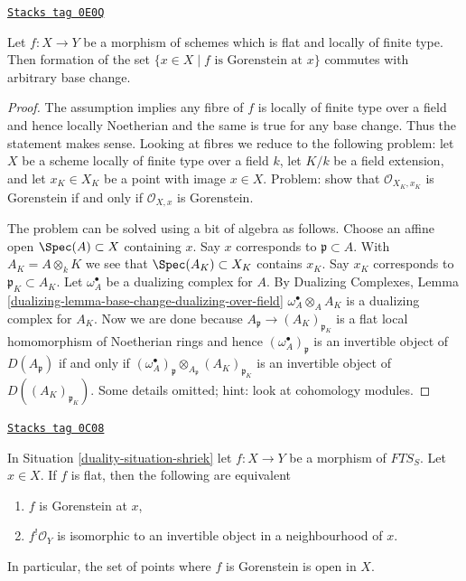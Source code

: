 \begin{lemma}
\label{duality-lemma-flat-lft-base-change-gorenstein}
\href{https://stacks.math.columbia.edu/tag/0E0Q}{\texttt{Stacks tag 0E0Q}}

Let $f : X \to Y$ be a morphism of schemes which is flat and
locally of finite type. Then formation of the set
$\{x \in X \mid f\text{ is Gorenstein at }x\}$
commutes with arbitrary base change.
\end{lemma}

\begin{proof}
The assumption implies any fibre of $f$ is locally of finite type
over a field and hence locally Noetherian and the same is true for
any base change. Thus the statement makes sense. Looking at
fibres we reduce to the following problem: let $X$ be a scheme
locally of finite type over a field $k$,
let $K/k$ be a field extension, and
let $x_K \in X_K$ be a point with image $x \in X$.
Problem: show that $\mathcal{O}_{X_K, x_K}$ is Gorenstein if and only if
$\mathcal{O}_{X, x}$ is Gorenstein.

\medskip\noindent
The problem can be solved using a bit of algebra as follows.
Choose an affine open $\Spec(A) \subset X$ containing $x$.
Say $x$ corresponds to $\mathfrak p \subset A$.
With $A_K = A \otimes_k K$ we see that $\Spec(A_K) \subset X_K$
contains $x_K$. Say $x_K$ corresponds to $\mathfrak p_K \subset A_K$.
Let $\omega_A^\bullet$ be a dualizing complex for $A$.
By Dualizing Complexes, Lemma
\ref{dualizing-lemma-base-change-dualizing-over-field}
$\omega_A^\bullet \otimes_A A_K$ is a dualizing complex for $A_K$.
Now we are done because
$A_\mathfrak p \to (A_K)_{\mathfrak p_K}$ is a flat local
homomorphism of Noetherian rings and hence
$(\omega_A^\bullet)_\mathfrak p$ is an invertible object
of $D(A_\mathfrak p)$ if and only if
$(\omega_A^\bullet)_\mathfrak p \otimes_{A_\mathfrak p} (A_K)_{\mathfrak p_K}$
is an invertible object of $D((A_K)_{\mathfrak p_K})$.
Some details omitted; hint: look at cohomology modules.
\end{proof}

\begin{lemma}
\label{duality-lemma-affine-flat-Noetherian-gorenstein}
\href{https://stacks.math.columbia.edu/tag/0C08}{\texttt{Stacks tag 0C08}}

In Situation \ref{duality-situation-shriek} let $f : X \to Y$ be a morphism
of $\textit{FTS}_S$. Let $x \in X$. If $f$ is flat, then
the following are equivalent
\begin{enumerate}
\item $f$ is Gorenstein at $x$,
\item $f^!\mathcal{O}_Y$ is isomorphic to an invertible object
in a neighbourhood of $x$.
\end{enumerate}
In particular, the set of points where $f$ is Gorenstein is
open in $X$.
\end{lemma}


